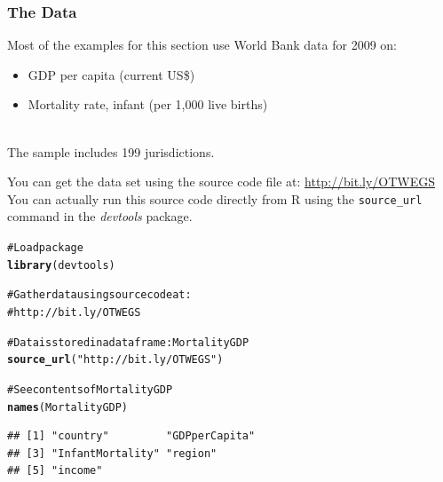 \documentclass{beamer}\usepackage{graphicx, color}
\makeatletter
\newcommand{\hlfunctioncall}[1]{\textcolor[rgb]{0.501960784313725,0,0.329411764705882}{\textbf{#1}}}%
\newcommand{\hlstring}[1]{\textcolor[rgb]{0.6,0.6,1}{#1}}%
\newcommand{\hlcomment}[1]{\textcolor[rgb]{0.180392156862745,0.6,0.341176470588235}{#1}}%
\newenvironment{kframe}{%
 \def\at@end@of@kframe{}%
 \ifinner\ifhmode%
  \def\at@end@of@kframe{\end{minipage}}%
  \begin{minipage}{\columnwidth}%
 \fi\fi%
 \def\FrameCommand##1{\hskip\@totalleftmargin \hskip-\fboxsep
 \colorbox{shadecolor}{##1}\hskip-\fboxsep
     \hskip-\linewidth \hskip-\@totalleftmargin \hskip\columnwidth}%
 \MakeFramed {\advance\hsize-\width
   \@totalleftmargin\z@ \linewidth\hsize
   \@setminipage}}%
 {\par\unskip\endMakeFramed%
 \at@end@of@kframe}
\newenvironment{knitrout}{}{} %
\makeatother
\begin{document}

\begin{frame}[fragile]
  \frametitle{The Data}
  Most of the examples for this section use World Bank data for 2009 on:
  \begin{itemize}
    \item GDP per capita (current US\$)
    \item Mortality rate, infant (per 1,000 live births)
  \end{itemize} \\[0.3cm]
  The sample includes 199 jurisdictions.
\end{frame}

\begin{frame}[fragile]
  You can get the data set using the source code file at: \url{http://bit.ly/OTWEGS} \\[0.5cm]
  You can actually run this source code directly from R using the \texttt{source\_url} command in the {\emph{devtools}} package.
\end{frame}

\begin{frame}[fragile]
\begin{knitrout}
\color{fgcolor}\begin{kframe}
\begin{alltt}
\hlcomment{# Load package}
\hlfunctioncall{library}(devtools)

\hlcomment{# Gather data using source code at:}
\hlcomment{# http://bit.ly/OTWEGS}

\hlcomment{# Data is stored in a data frame: MortalityGDP}
\hlfunctioncall{source_url}(\hlstring{"http://bit.ly/OTWEGS"})

\hlcomment{# See contents of MortalityGDP}
\hlfunctioncall{names}(MortalityGDP)
\end{alltt}
\begin{verbatim}
## [1] "country"         "GDPperCapita"   
## [3] "InfantMortality" "region"         
## [5] "income"
\end{verbatim}
\end{kframe}
\end{knitrout}

\end{frame}
\end{document}
